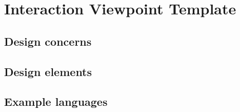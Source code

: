 \chapter{Interaction Viewpoint Template} \label{chp:interaction-viewpoint-template}
	\begin{comment}
		The Interaction viewpoint defines strategies for interaction among entities, regarding why, where, how, and
		at what level actions occur.
	\end{comment}
	
	\section{Design concerns} \label{s:interaction-viewpoint-template:design-concerns}
		\begin{comment}
			For designers. this includes evaluating allocation of responsibilities in collaborations, especially when
			adapting and applying design patterns; discovery or description of interactions in terms of messages among
			affected objects in fulfilling required actions; and state transition logic and concurrency for reactive,
			interactive, distributed, real-time, and similar systems.
		\end{comment}
	
	\section{Design elements} \label{s:interaction-viewpoint-template:design-elements}
		\begin{comment}
			Classes, methods. states, events, signals, hierarchy, concurrency, timing, and synchronization.
		\end{comment}
	
	\section{Example languages} \label{s:interaction-viewpoint-template:example-languages}
		\begin{comment}
			UML composite structure diagram, UML interaction diagram (OMG [B28]).
		\end{comment}